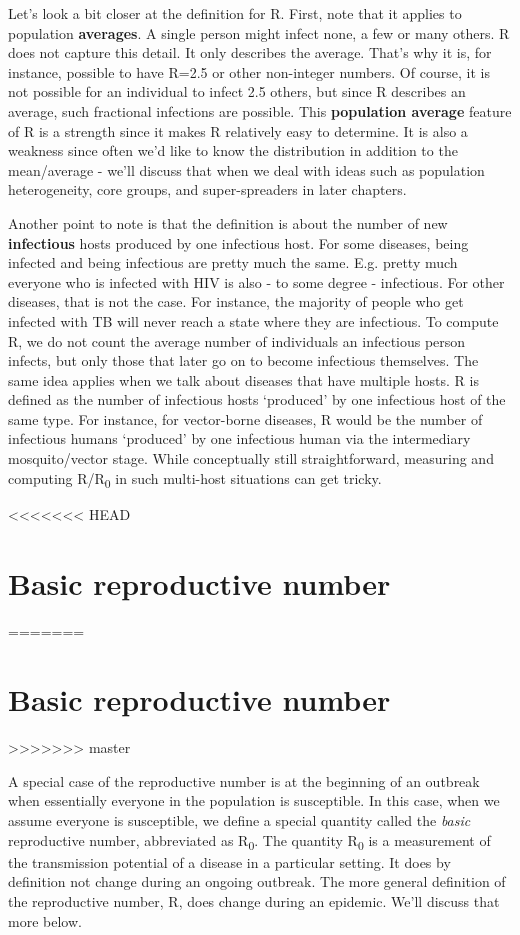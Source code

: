 \documentclass[]{book}
\theoremstyle{definition}
\theoremstyle{definition}
\theoremstyle{definition}
\theoremstyle{remark}
\begin{document}
Let's look a bit closer at the definition for R. First, note that it
applies to population \textbf{averages}. A single person might infect
none, a few or many others. R does not capture this detail. It only
describes the average. That's why it is, for instance, possible to have
R=2.5 or other non-integer numbers. Of course, it is not possible for an
individual to infect 2.5 others, but since R describes an average, such
fractional infections are possible. This \textbf{population average}
feature of R is a strength since it makes R relatively easy to
determine. It is also a weakness since often we'd like to know the
distribution in addition to the mean/average - we'll discuss that when
we deal with ideas such as population heterogeneity, core groups, and
super-spreaders in later chapters.

Another point to note is that the definition is about the number of new
\textbf{infectious} hosts produced by one infectious host. For some
diseases, being infected and being infectious are pretty much the same.
E.g. pretty much everyone who is infected with HIV is also - to some
degree - infectious. For other diseases, that is not the case. For
instance, the majority of people who get infected with TB will never
reach a state where they are infectious. To compute R, we do not count
the average number of individuals an infectious person infects, but only
those that later go on to become infectious themselves. The same idea
applies when we talk about diseases that have multiple hosts. R is
defined as the number of infectious hosts `produced' by one infectious
host of the same type. For instance, for vector-borne diseases, R would
be the number of infectious humans `produced' by one infectious human
via the intermediary mosquito/vector stage. While conceptually still
straightforward, measuring and computing R/R\textsubscript{0} in such
multi-host situations can get tricky.

<<<<<<< HEAD
\hypertarget{basic-reproductive-number}{%
\section{Basic reproductive number}\label{basic-reproductive-number}}
=======
\section{Basic reproductive number}\label{basic-reproductive-number}
>>>>>>> master

A special case of the reproductive number is at the beginning of an
outbreak when essentially everyone in the population is susceptible. In
this case, when we assume everyone is susceptible, we define a special
quantity called the \emph{basic} reproductive number, abbreviated as
R\textsubscript{0}. The quantity R\textsubscript{0} is a measurement of
the transmission potential of a disease in a particular setting. It does
by definition not change during an ongoing outbreak. The more general
definition of the reproductive number, R, does change during an
epidemic. We'll discuss that more below.
\end{document}
